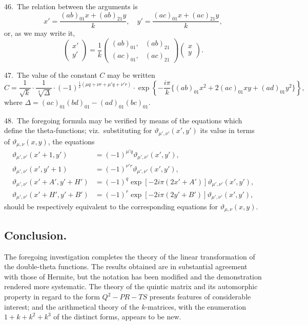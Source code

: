 \documentclass[11pt,a4paper]{article}
\theoremstyle{definition}
\begin{document}
\medskip

46.\ The relation between the arguments is
\[
x' = \frac{(ab)_{01}x + (ab)_{21}y}{k}, \quad y' = \frac{(ac)_{01}x + (ac)_{21}y}{k},
\]
or, as we may write it,
\[
\begin{pmatrix} x' \\ y' \end{pmatrix}
= \frac{1}{k}
\begin{pmatrix} (ab)_{01}, & (ab)_{21} \\ (ac)_{01}, & (ac)_{21} \end{pmatrix}
\begin{pmatrix} x \\ y \end{pmatrix}.
\]

\medskip

47.\ The value of the constant $C$ may be written
\[
C = \frac{1}{\sqrt{k}} \cdot \frac{1}{\sqrt[4]{\Delta}} \cdot (-1)^{\frac{1}{2}(\mu q + \nu r + \mu' q + \nu' r)} \cdot \exp\left\{-\frac{i\pi}{k}\{(ab)_{01}x^2 + 2(ac)_{01}xy + (ad)_{01}y^2\}\right\},
\]
where $\Delta = (ac)_{01}(bd)_{01} - (ad)_{01}(bc)_{01}$.

\medskip

48.\ The foregoing formula may be verified by means of the equations which define the theta-functions; viz.\ substituting for $\vartheta_{\mu',\nu'}(x', y')$ its value in terms of $\vartheta_{\mu,\nu}(x, y)$, the equations
\begin{align*}
\vartheta_{\mu',\nu'}(x'+1, y') &= (-1)^{\mu' q}\vartheta_{\mu',\nu'}(x', y'),\\
\vartheta_{\mu',\nu'}(x', y'+1) &= (-1)^{\nu' r}\vartheta_{\mu',\nu'}(x', y'),\\
\vartheta_{\mu',\nu'}(x'+A', y'+H') &= (-1)^{q}\exp[-2i\pi(2x'+A')]\vartheta_{\mu',\nu'}(x', y'),\\
\vartheta_{\mu',\nu'}(x'+H', y'+B') &= (-1)^{r}\exp[-2i\pi(2y'+B')]\vartheta_{\mu',\nu'}(x', y'),
\end{align*}
should be respectively equivalent to the corresponding equations for $\vartheta_{\mu,\nu}(x, y)$.

\bigskip

\subsection*{Conclusion.}

The foregoing investigation completes the theory of the linear transformation of the double-theta functions. The results obtained are in substantial agreement with those of Hermite, but the notation has been modified and the demonstration rendered more systematic. The theory of the quintic matrix and its automorphic property in regard to the form $Q^2 - PR - TS$ presents features of considerable interest; and the arithmetical theory of the $k$-matrices, with the enumeration $1 + k + k^2 + k^3$ of the distinct forms, appears to be new.

\newpage
\end{document}
